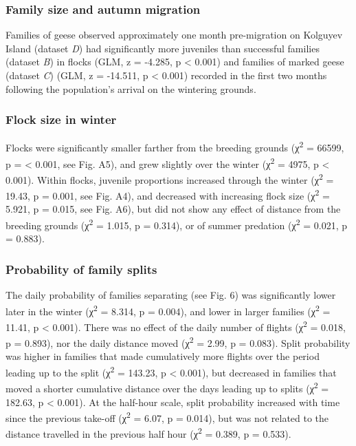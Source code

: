 \documentclass[10pt,twocolumn]{paper}
\begin{document}
\subsubsection{Family size and autumn
migration}\label{family-size-and-autumn-migration}

Families of geese observed approximately one month pre-migration on
Kolguyev Island (dataset \emph{D}) had significantly more juveniles than
successful families (dataset \emph{B}) in flocks (GLM, z = -4.285, p
\textless{} 0.001) and families of marked geese (dataset \emph{C}) (GLM,
z = -14.511, p \textless{} 0.001) recorded in the first two months
following the population's arrival on the wintering grounds.

\subsubsection{Flock size in winter}\label{flock-size-in-winter}

Flocks were significantly smaller farther from the breeding grounds
(χ\textsuperscript{2} = 66599, p = \textless{} 0.001, see Fig. A5), and
grew slightly over the winter (χ\textsuperscript{2} = 4975, p
\textless{} 0.001). Within flocks, juvenile proportions increased
through the winter (χ\textsuperscript{2} = 19.43, p = 0.001, see Fig.
A4), and decreased with increasing flock size (χ\textsuperscript{2} =
5.921, p = 0.015, see Fig. A6), but did not show any effect of distance
from the breeding grounds (χ\textsuperscript{2} = 1.015, p = 0.314), or
of summer predation (χ\textsuperscript{2} = 0.021, p = 0.883).

\subsubsection{Probability of family
splits}\label{probability-of-family-splits}

The daily probability of families separating (see Fig. 6) was
significantly lower later in the winter (χ\textsuperscript{2} = 8.314, p
= 0.004), and lower in larger families (χ\textsuperscript{2} = 11.41, p
\textless{} 0.001). There was no effect of the daily number of flights
(χ\textsuperscript{2} = 0.018, p = 0.893), nor the daily distance moved
(χ\textsuperscript{2} = 2.99, p = 0.083). Split probability was higher
in families that made cumulatively more flights over the period leading
up to the split (χ\textsuperscript{2} = 143.23, p \textless{} 0.001),
but decreased in families that moved a shorter cumulative distance over
the days leading up to splits (χ\textsuperscript{2} = 182.63, p
\textless{} 0.001). At the half-hour scale, split probability increased
with time since the previous take-off (χ\textsuperscript{2} = 6.07, p =
0.014), but was not related to the distance travelled in the previous
half hour (χ\textsuperscript{2} = 0.389, p = 0.533).
\end{document}
